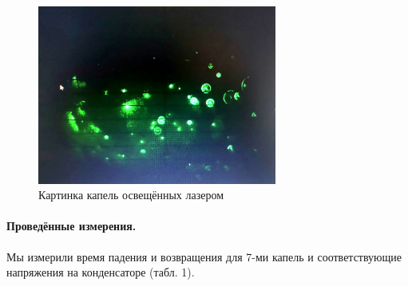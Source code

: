 \documentclass[a4paper,12pt]{article} %
\begin{document}
\begin{figure}
\centering
\includegraphics[width=0.7\textwidth]{drops.jpg}
\caption{Картинка капель освещённых лазером}
\label{drops}
\end{figure}

\paragraph{Проведённые измерения.} Мы измерили время падения и возвращения для 7-ми капель и соответствующие напряжения на конденсаторе (табл. 1).
\end{document}
